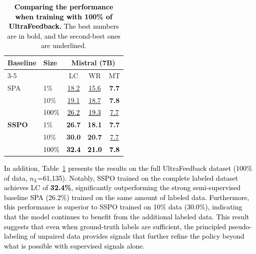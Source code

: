 \documentclass{article} %
\newcommand\rebuttal[1]{\textcolor{black}{#1}}
\begin{document}
\vspace{2mm}
\begin{table} 
    \centering
    \small
    \caption{\rebuttal{\textbf{Comparing the performance when training with 100\% of UltraFeedback.} The best numbers are in bold, and the second-best ones are underlined.}}
    \setlength{\tabcolsep}{3.05mm}
    \label{tab:real_much_paired_data}
    \begin{tabular}{ll ccc}
        \toprule
 
        \multirow{2}{*}{\textbf{Baseline}} & \multirow{2}{*}{\textbf{Size}} & \multicolumn{3}{c}{\textbf{Mistral (7B)}} \\
        \cmidrule(lr){3-5}
         & & LC & WR & MT \\
        \midrule
        SPA & 1\% & \underline{18.2} & \underline{15.6} & \textbf{7.7} \\
            & 10\%  & \underline{19.1} & \underline{18.7} & \textbf{7.8} \\
            & \rebuttal{100\%} & \rebuttal{\underline{26.2}} & \rebuttal{\underline{19.3}} & \rebuttal{\underline{7.7}} \\
        \midrule
        \midrule
        \textbf{SSPO} & 1\% & \textbf{26.7} & \textbf{18.1} & \textbf{7.7} \\ 
                      & 10\%  & \textbf{30.0} & \textbf{20.7} & \underline{7.7} \\
                      & \rebuttal{100\%} & \rebuttal{\textbf{32.4}} & \rebuttal{\textbf{21.0}} & \rebuttal{\textbf{7.8}} \\
        \bottomrule 
    \end{tabular}

\end{table}


\rebuttal{In addition, Table~\ref{tab:real_much_paired_data} presents the results on the full UltraFeedback dataset (100\% of data, $n_L$=61,135). Notably, SSPO trained on the complete labeled dataset achieves LC of \textbf{32.4\%}, significantly outperforming the strong semi-supervised baseline SPA (26.2\%) trained on the same amount of labeled data. Furthermore, this performance is superior to SSPO trained on 10\% data (30.0\%), indicating that the model continues to benefit from the additional labeled data. This result suggests that even when ground-truth labels are sufficient, the principled pseudo-labeling of unpaired data provides signals that further refine the policy beyond what is possible with supervised signals alone.}
\end{document}
